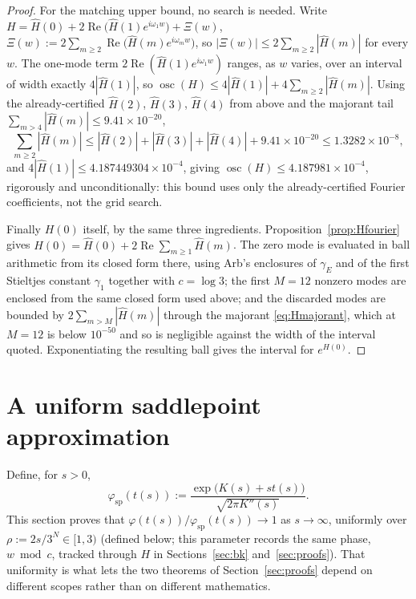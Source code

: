\documentclass[11pt]{article}
\theoremstyle{definition}
\theoremstyle{remark}
\begin{document}
\begin{proof}
For the matching upper bound, no search is needed. Write $H = \hat H(0) + 2\operatorname{Re}\bigl(
\hat H(1)e^{i\omega_1 w}\bigr) + \Xi(w)$, $\Xi(w) := 2\sum_{m\ge2}\operatorname{Re}\bigl(\hat H(m)
e^{i\omega_m w}\bigr)$, so $|\Xi(w)|\le2\sum_{m\ge2}|\hat H(m)|$ for every $w$. The one-mode term
$2\operatorname{Re}(\hat H(1)e^{i\omega_1w})$ ranges, as $w$ varies, over an interval of width
exactly $4|\hat H(1)|$, so $\operatorname{osc}(H) \le 4|\hat H(1)| + 4\sum_{m\ge2}|\hat H(m)|$.
Using the already-certified $\hat H(2)$, $\hat H(3)$, $\hat H(4)$ from above and the majorant tail
$\sum_{m>4}|\hat H(m)|\le9.41\times10^{-20}$,
\[
\sum_{m\ge2}|\hat H(m)| \le |\hat H(2)|+|\hat H(3)|+|\hat H(4)|+9.41\times10^{-20} \le
1.3282\times10^{-8},
\]
and $4|\hat H(1)| \le 4.187449304\times10^{-4}$, giving $\operatorname{osc}(H) \le
4.187981\times10^{-4}$, rigorously and unconditionally: this bound uses only the already-certified
Fourier coefficients, not the grid search.

Finally $H(0)$ itself, by the same three ingredients. Proposition~\ref{prop:Hfourier} gives
$H(0) = \hat H(0) + 2\operatorname{Re}\sum_{m\ge1}\hat H(m)$. The zero mode is evaluated in ball
arithmetic from its closed form there, using Arb's enclosures of $\gamma_E$ and of the first
Stieltjes constant $\gamma_1$ together with $c=\log3$; the first $M=12$ nonzero modes are enclosed
from the same closed form used above; and the discarded modes are bounded by
$2\sum_{m>M}|\hat H(m)|$ through the majorant \eqref{eq:Hmajorant}, which at $M=12$ is below
$10^{-50}$ and so is negligible against the width of the interval quoted. Exponentiating the
resulting ball gives the interval for $e^{H(0)}$.
\end{proof}

\section{A uniform saddlepoint approximation}
\label{sec:formulaA}

Define, for $s>0$,
\[
\varphi_{\mathrm{sp}}(t(s)) := \frac{\exp\bigl(K(s)+st(s)\bigr)}{\sqrt{2\pi K''(s)}}.
\]
This section proves that $\varphi(t(s))/\varphi_{\mathrm{sp}}(t(s)) \to 1$ as $s \to \infty$,
uniformly over $\rho:=2s/3^N\in[1,3)$ (defined below; this parameter records the same phase,
$w\bmod c$, tracked through $H$ in Sections~\ref{sec:bk} and~\ref{sec:proofs}). That uniformity is
what lets the two theorems of Section~\ref{sec:proofs} depend on different scopes rather than on
different mathematics.
\end{document}
